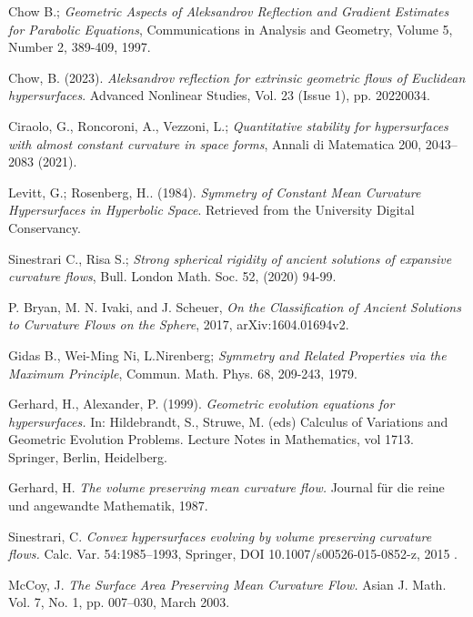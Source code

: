 \documentclass[a4paper, 12pt]{book}
\begin{document}
{}
\begin{thebibliography}{11} 
	 Chow B.; {\em Geometric Aspects of Aleksandrov Reflection and Gradient Estimates for Parabolic Equations}, Communications in Analysis and Geometry, Volume 5, Number 2, 389-409, 1997.
	
	 Chow, B. (2023). {\em Aleksandrov reflection for extrinsic geometric flows of Euclidean hypersurfaces}. Advanced Nonlinear Studies, Vol. 23 (Issue 1), pp. 20220034.
	
	 Ciraolo, G., Roncoroni, A., Vezzoni, L.;  {\em Quantitative stability for hypersurfaces with almost constant curvature in space forms}, Annali di Matematica 200, 2043–2083 (2021).
	
	Levitt, G.; Rosenberg, H.. (1984). {\em Symmetry of Constant Mean Curvature Hypersurfaces in Hyperbolic Space}. Retrieved from the University Digital Conservancy.%
	
	 Sinestrari C., Risa S.; {\em Strong spherical rigidity of ancient solutions of expansive curvature flows},  Bull. London Math. Soc. 52, (2020) 94-99. 
	
	P. Bryan, M. N. Ivaki, and J. Scheuer, {\em On the Classification of Ancient Solutions to Curvature Flows on the Sphere}, 2017,
	arXiv:1604.01694v2.
	
	 Gidas B., Wei-Ming Ni, L.Nirenberg; {\em Symmetry and Related Properties via the Maximum Principle},  Commun. Math. Phys. 68, 209-243, 1979. 
	
	 Gerhard, H., Alexander, P. (1999). {\em Geometric evolution equations for hypersurfaces.} In: Hildebrandt, S., Struwe, M. (eds) Calculus of Variations and Geometric Evolution Problems. Lecture Notes in Mathematics, vol 1713. Springer, Berlin, Heidelberg.
	
	 Gerhard, H. {\em The volume preserving mean curvature flow.} Journal f\"{u}r die reine und
	angewandte Mathematik, 1987.
	
	 Sinestrari, C. {\em Convex hypersurfaces evolving by volume preserving curvature flows.} Calc. Var. 54:1985–1993, Springer, DOI 10.1007/s00526-015-0852-z, 2015 .
	
	 McCoy, J. {\em The Surface Area Preserving Mean Curvature Flow.} Asian J. Math. Vol. 7, No. 1, pp. 007–030, March 2003.
	

\end{thebibliography}
\end{document}
